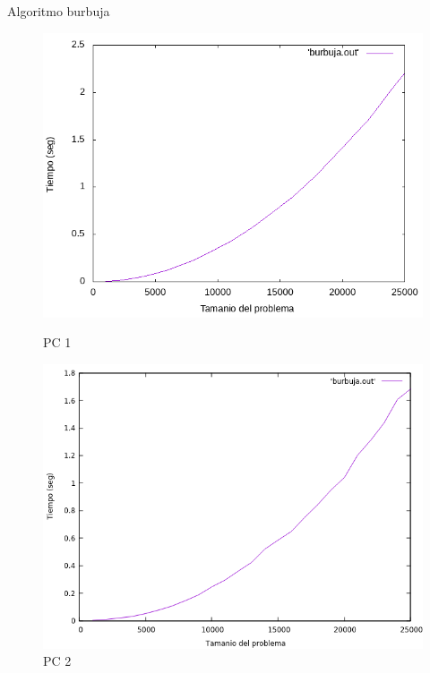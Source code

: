 \documentclass{beamer}
\begin{document}
\begin{frame}[fragile]{Algoritmo burbuja}
\begin{figure}[H]
\centering
\begin{minipage}{.5\textwidth}
  \centering
  \includegraphics[width=\linewidth]{empirica_burbuja.png}
   \caption*{PC 1}
\end{minipage}%
\begin{minipage}{.5\textwidth}
  \centering
  \includegraphics[width=\linewidth]{empirica_burbuja_2.png}
  \caption*{PC 2}
\end{minipage}
\end{figure}
\end{frame}
\end{document}
